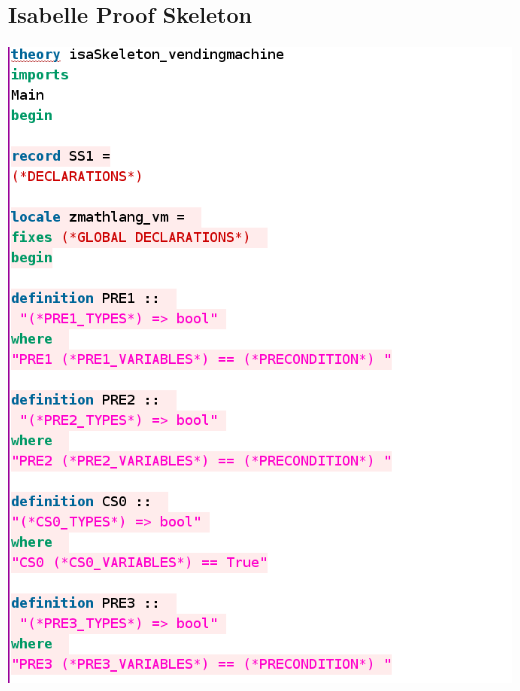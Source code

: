 \subsection{Isabelle Proof Skeleton}
\label{app:vm4}
\includegraphics[scale=0.5]{examples/vm/4imagea.png}

